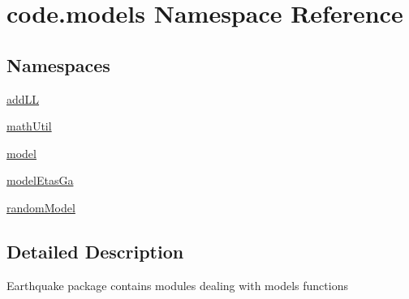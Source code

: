 \hypertarget{namespacecode_1_1models}{}\section{code.\+models Namespace Reference}
\label{namespacecode_1_1models}
\subsection*{Namespaces}
\begin{DoxyCompactItemize}
\item 
 \hyperlink{namespacecode_1_1models_1_1add_l_l}{add\+LL}
\item 
 \hyperlink{namespacecode_1_1models_1_1math_util}{math\+Util}
\item 
 \hyperlink{namespacecode_1_1models_1_1model}{model}
\item 
 \hyperlink{namespacecode_1_1models_1_1model_etas_ga}{model\+Etas\+Ga}
\item 
 \hyperlink{namespacecode_1_1models_1_1random_model}{random\+Model}
\end{DoxyCompactItemize}


\subsection{Detailed Description}
\begin{DoxyVerb}Earthquake package contains modules dealing with models functions
\end{DoxyVerb}
 